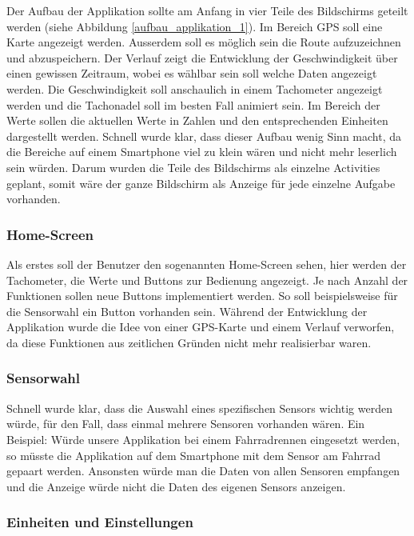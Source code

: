 Der Aufbau der Applikation sollte am Anfang in vier Teile des Bildschirms geteilt werden (siehe Abbildung \ref{aufbau_applikation_1}). 
Im Bereich GPS soll eine Karte angezeigt werden. Ausserdem soll es möglich sein die Route aufzuzeichnen und abzuspeichern.
Der Verlauf zeigt die Entwicklung der Geschwindigkeit über einen gewissen Zeitraum, wobei es wählbar sein soll welche Daten angezeigt werden.
Die Geschwindigkeit soll anschaulich in einem Tachometer angezeigt werden und die Tachonadel soll im besten Fall animiert sein.
Im Bereich der Werte sollen die aktuellen Werte in Zahlen und den entsprechenden Einheiten dargestellt werden.
Schnell wurde klar, dass dieser Aufbau wenig Sinn macht, da die Bereiche auf einem Smartphone viel zu klein wären und nicht mehr leserlich sein würden. Darum wurden die Teile des Bildschirms als einzelne Activities geplant, somit wäre der ganze Bildschirm als Anzeige für jede einzelne Aufgabe vorhanden.

\subsubsection{Home-Screen}

Als erstes soll der Benutzer den sogenannten Home-Screen sehen, hier werden der Tachometer, die Werte und Buttons zur Bedienung angezeigt. Je nach Anzahl der Funktionen sollen neue Buttons implementiert werden. So soll beispielsweise für die Sensorwahl ein Button vorhanden sein. Während der Entwicklung der Applikation wurde die Idee von einer GPS-Karte und einem Verlauf verworfen, da diese Funktionen aus zeitlichen Gründen nicht mehr realisierbar waren.

\subsubsection{Sensorwahl}

Schnell wurde klar, dass die Auswahl eines spezifischen Sensors wichtig werden würde, für den Fall, dass einmal mehrere Sensoren vorhanden wären. Ein Beispiel: Würde unsere Applikation bei einem Fahrradrennen eingesetzt werden, so müsste die Applikation auf dem Smartphone mit dem Sensor am Fahrrad gepaart werden. Ansonsten würde man die Daten von allen Sensoren empfangen und die Anzeige würde nicht die Daten des eigenen Sensors anzeigen.

\subsubsection{Einheiten und Einstellungen}


